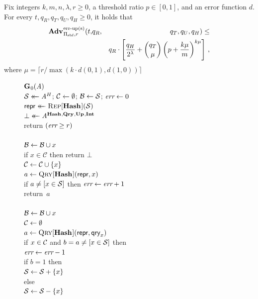\begin{theorem}\label{thm:count-bf-bound}
Fix integers $k, m, n, \lambda, r\geq 0$, a threshold ratio $p \in [0,1]$, and an error function $d$.
  For every $t, q_R, q_T, q_U, q_H \geq 0$, it holds that
  \begin{eqnarray*}
    \Adv{\erreps}_{\struct_\saltybloom,r}(t,&q_R,& q_T, q_U, q_H) \leq \\ && q_R \cdot \left[\frac{q_H}{2^\lambda} + \binom{q_T}{\mu}\left(p+\frac{k\mu}{m}\right)^{k\mu}\right] \,,
\end{eqnarray*}
where $\mu = \lceil r/\max(k \cdot d(0,1), d(1,0)) \rceil$
\end{theorem}

\begin{figure}
  {
    \underline{$\mathbf{G}\hspace{0.5pt}_0(\mathit{A})$}\\[2pt]
      $\mathcal{S} \mathrel{\leftarrow\mkern-14mu\leftarrow} \mathit{A}^H$; $\mathcal{C} \gets \emptyset$; $\mathcal{B} \gets \mathcal{S}$; $\textit{err} \gets 0$\\
      $\mathsf{repr} \mathrel{\leftarrow\mkern-14mu\leftarrow} \textsc{Rep}[\mathbf{Hash}\hspace{0.5pt}](\mathcal{S})$\\
      $\bot \mathrel{\leftarrow\mkern-14mu\leftarrow} \mathit{A}^{\mathbf{Hash}\hspace{0.5pt},\mathbf{Qry}\hspace{0.5pt},\mathbf{Up}\hspace{0.5pt},\mathbf{Int}\hspace{0.5pt}}$\\
      return $(\textit{err} \geq r)$
    \\[6pt]
    \\[2pt]
      $\mathcal{B} \gets \mathcal{B} \cup x$\\
      if $x \in \mathcal{C}$ then return $\bot$\\
      $\mathcal{C} \gets \mathcal{C} \cup \{x\}$\\
      $a \gets \textsc{Qry}[\mathbf{Hash}\hspace{0.5pt}](\mathsf{repr}, x)$\\
      if $a \neq [x \in \mathcal{S}]$ then $\textit{err} \gets \textit{err} + 1$\\
      return~$a$
    \\[6pt]
    \\[2pt]
      $\mathcal{B} \gets \mathcal{B} \cup x$\\
      $\mathcal{C} \gets \emptyset$\\
      $a \gets \textsc{Qry}[\mathbf{Hash}\hspace{0.5pt}](\mathsf{repr}, \mathsf{qry}_x)$\\
      if $x \in \mathcal{C}$ and $b = a \neq [x \in \mathcal{S}]$ then\\
      \tab $\textit{err} \gets \textit{err}-1$\\
      if $b = 1$ then\\
      \tab $\mathcal{S} \gets \mathcal{S} + \{x\}$\\
      else\\
      \tab $\mathcal{S} \gets \mathcal{S} - \{x\}$\\
}
\end{figure}
